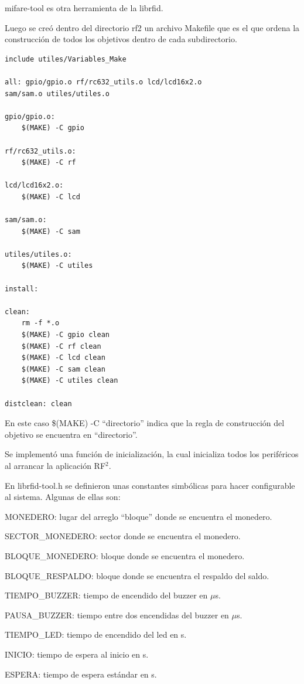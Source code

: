 mifare-tool es otra herramienta de la librfid.

\bigskip
Luego se creó dentro del directorio rf2 un archivo Makefile que es el que ordena la construcción de todos los objetivos dentro de cada subdirectorio.

\begin{verbatim}
include utiles/Variables_Make 

all: gpio/gpio.o rf/rc632_utils.o lcd/lcd16x2.o 
sam/sam.o utiles/utiles.o 

gpio/gpio.o: 
	$(MAKE) -C gpio 

rf/rc632_utils.o: 
	$(MAKE) -C rf 

lcd/lcd16x2.o: 
	$(MAKE) -C lcd 

sam/sam.o: 
	$(MAKE) -C sam 
	 
utiles/utiles.o: 
	$(MAKE) -C utiles 

install: 

clean: 
	rm -f *.o 
	$(MAKE) -C gpio clean 
	$(MAKE) -C rf clean 
	$(MAKE) -C lcd clean 
	$(MAKE) -C sam clean 
	$(MAKE) -C utiles clean 

distclean: clean
\end{verbatim}

\bigskip
En este caso \$(MAKE) -C “directorio” indica que la regla de construcción del objetivo se encuentra en “directorio”.

\bigskip
Se implementó una función de inicialización, la cual inicializa todos los periféricos al arrancar la aplicación RF$^{2}$.

En librfid-tool.h se definieron unas constantes simbólicas para hacer configurable al sistema. Algunas de ellas son:

\bigskip
MONEDERO: lugar del arreglo “bloque” donde se encuentra el monedero.

SECTOR\_MONEDERO: sector donde se encuentra el monedero.

BLOQUE\_MONEDERO: bloque donde se encuentra el monedero.

BLOQUE\_RESPALDO: bloque donde se encuentra el respaldo del saldo.

TIEMPO\_BUZZER: tiempo de encendido del buzzer en $\mu$s.

PAUSA\_BUZZER: tiempo entre dos encendidas del buzzer en $\mu$s.

TIEMPO\_LED: tiempo de encendido del led en s.

INICIO: tiempo de espera al inicio en s. 

ESPERA: tiempo de espera estándar en s. 

